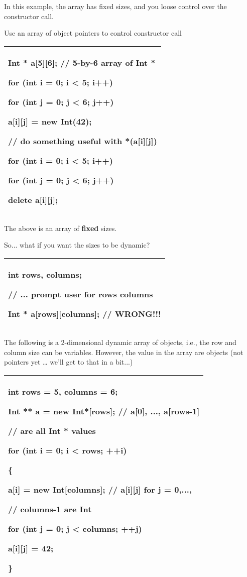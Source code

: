 \documentclass[
]{article}
\begin{document}
In this example, the array has fixed sizes, and you loose control over
the constructor call.

Use an array of object pointers to control constructor call

\begin{longtable}[]{@{}l@{}}
\toprule
\endhead
\begin{minipage}[t]{0.97\columnwidth}\raggedright
Int * a{[}5{]}{[}6{]}; // 5-by-6 array of Int *

for (int i = 0; i \textless{} 5; i++)

for (int j = 0; j \textless{} 6; j++)

a{[}i{]}{[}j{]} = new Int(42);

// do something useful with *(a{[}i{]}{[}j{]})

for (int i = 0; i \textless{} 5; i++)

for (int j = 0; j \textless{} 6; j++)

delete a{[}i{]}{[}j{]};\strut
\end{minipage}\tabularnewline
\bottomrule
\end{longtable}

The above is an array of \textbf{fixed} sizes.

So... what if you want the sizes to be dynamic?

\begin{longtable}[]{@{}l@{}}
\toprule
\endhead
\begin{minipage}[t]{0.97\columnwidth}\raggedright
int rows, columns;

// ... prompt user for rows columns

Int * a{[}rows{]}{[}columns{]}; // WRONG!!!\strut
\end{minipage}\tabularnewline
\bottomrule
\end{longtable}

The following is a 2-dimensional dynamic array of objects, i.e., the row
and column size can be variables. However, the value in the array are
objects (not pointers yet \ldots{} we'll get to that in a bit...)

\begin{longtable}[]{@{}l@{}}
\toprule
\endhead
\begin{minipage}[t]{0.97\columnwidth}\raggedright
int rows = 5, columns = 6;

Int ** a = new Int*{[}rows{]}; // a{[}0{]}, ..., a{[}rows-1{]}

// are all Int * values

for (int i = 0; i \textless{} rows; ++i)

\{

a{[}i{]} = new Int{[}columns{]}; // a{[}i{]}{[}j{]} for j = 0,...,

// columns-1 are Int

for (int j = 0; j \textless{} columns; ++j)

a{[}i{]}{[}j{]} = 42;

\}\strut
\end{minipage}\tabularnewline
\bottomrule
\end{longtable}
\end{document}
